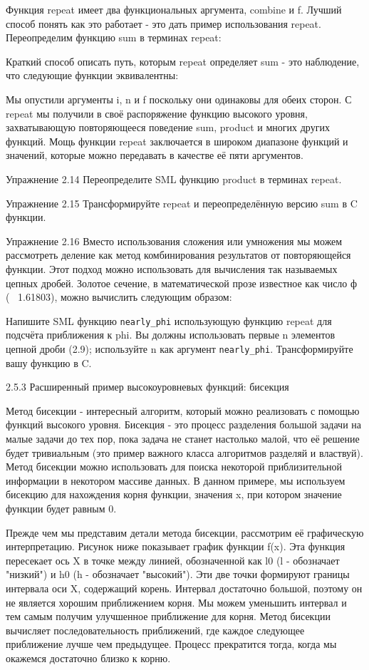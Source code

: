 Функция repeat имеет два функциональных аргумента, combine и f. Лучший способ понять как это работает - это дать пример использования repeat. Переопределим функцию sum в терминах repeat:

Краткий способ описать путь, которым repeat определяет sum - это наблюдение, что следующие функции эквивалентны:

Мы опустили аргументы i, n и f поскольку они одинаковы для обеих сторон. С repeat мы получили в своё распоряжение функцию высокого уровня, захватывающую повторяющееся поведение sum, product и многих других функций. Мощь функции repeat заключается в широком диапазоне функций и значений, которые можно передавать в качестве её пяти аргументов.

Упражнение 2.14 Переопределите SML функцию product в терминах repeat.

Упражнение 2.15 Трансформируйте repeat и переопределённую версию sum в C функции.

Упражнение 2.16 Вместо использования сложения или умножения мы можем рассмотреть деление как метод комбинирования результатов от повторяющейся функции. Этот подход можно использовать для вычисления так называемых цепных дробей. Золотое сечение, в математической прозе известное как число ф (~ 1.61803), можно вычислить следующим образом:

Напишите SML функцию \lstinline|nearly_phi| использующую функцию repeat для подсчёта приближения к phi. Вы должны использовать первые n элементов цепной дроби (2.9); используйте n как аргумент \lstinline|nearly_phi|. Трансформируйте вашу функцию в C.

2.5.3 Расширенный пример высокоуровневых функций: бисекция

Метод бисекции - интересный алгоритм, который можно реализовать с помощью функций высокого уровня. Бисекция - это процесс разделения большой задачи на малые задачи до тех пор, пока задача не станет настолько малой, что её решение будет тривиальным (это пример важного класса алгоритмов разделяй и властвуй). Метод бисекции можно использовать для поиска некоторой приблизительной информации в некотором массиве данных. В данном примере, мы используем бисекцию для нахождения корня функции, значения x, при котором значение функции будет равным 0.

Прежде чем мы представим детали метода бисекции, рассмотрим её графическую интерпретацию. Рисунок ниже показывает график функции f(x). Эта функция пересекает ось X в точке между линией, обозначенной как l0 (l - обозначает "низкий") и h0 (h - обозначает "высокий"). Эти две точки формируют границы интервала оси X, содержащий корень. Интервал достаточно большой, поэтому он не является хорошим приближением корня. Мы можем уменьшить интервал и тем самым получим улучшенное приближение для корня. Метод бисекции вычисляет последовательность приближений, где каждое следующее приближение лучше чем предыдущее. Процесс прекратится тогда, когда мы окажемся достаточно близко к корню.

